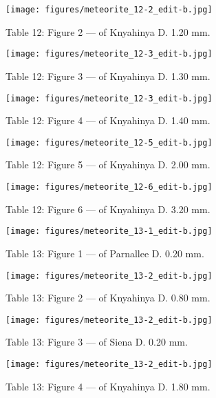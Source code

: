 \documentclass[a4paper, 12pt, oneside]{article}
\begin{document}
\clearpage
\begin{figure}[t]
\texttt{[image: figures/meteorite\_12-2\_edit-b.jpg]}
\caption{Table 12: Figure 2 --- of Knyahinya D. 1.20 mm.}
\centering
\end{figure}
\clearpage
\begin{figure}[t]
\texttt{[image: figures/meteorite\_12-3\_edit-b.jpg]}
\caption{Table 12: Figure 3 --- of Knyahinya D. 1.30 mm.}
\centering
\end{figure}
\clearpage
\begin{figure}[t]
\texttt{[image: figures/meteorite\_12-3\_edit-b.jpg]}
\caption{Table 12: Figure 4 --- of Knyahinya D. 1.40 mm.}
\centering
\end{figure}
\clearpage
\begin{figure}[t]
\texttt{[image: figures/meteorite\_12-5\_edit-b.jpg]}
\caption{Table 12: Figure 5 --- of Knyahinya D. 2.00 mm.}
\centering
\end{figure}
\clearpage
\begin{figure}[t]
\texttt{[image: figures/meteorite\_12-6\_edit-b.jpg]}
\caption{Table 12: Figure 6 --- of Knyahinya D. 3.20 mm.}
\centering
\end{figure}
\clearpage
\begin{figure}[t]
\texttt{[image: figures/meteorite\_13-1\_edit-b.jpg]}
\caption{Table 13: Figure 1 --- of Parnallee D. 0.20 mm.}
\centering
\end{figure}
\clearpage
\begin{figure}[t]
\texttt{[image: figures/meteorite\_13-2\_edit-b.jpg]}
\caption{Table 13: Figure 2 --- of Knyahinya D. 0.80 mm.}
\centering
\end{figure}
\clearpage
\begin{figure}[t]
\texttt{[image: figures/meteorite\_13-2\_edit-b.jpg]}
\caption{Table 13: Figure 3 --- of Siena D. 0.20 mm.}
\centering
\end{figure}
\clearpage
\begin{figure}[t]
\texttt{[image: figures/meteorite\_13-2\_edit-b.jpg]}
\caption{Table 13: Figure 4 --- of Knyahinya D. 1.80 mm.}
\centering
\end{figure}
\end{document}
